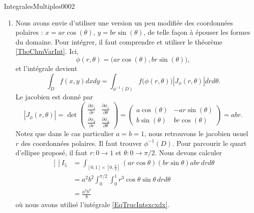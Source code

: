 \begin{corrige}{IntegralesMultiples0002}
\begin{enumerate}
		\item
			Nous avons envie d'utiliser une version un peu modifiée des coordonnées polaires : $x=ar\cos(\theta)$, $y=br\sin(\theta)$, de telle façon à épouser les formes du domaine. Pour intégrer, il faut comprendre et utiliser le théorème \ref{ThoChmVarInt}. Ici,
			\begin{equation}
				\phi(r,\theta)=\big( ar\cos(\theta),br\sin(\theta) \big),
			\end{equation}
			et l'intégrale devient
			\begin{equation}
				\int_D f(x,y)dxdy=\int_{\phi^{-1}(D)}f\big( \phi(r,\theta) \big)| J_{\phi}(r,\theta) |drd\theta.
			\end{equation}
			Le jacobien est donné par
			\begin{equation}
				| J_{\phi}(r,\theta) |=\det\begin{pmatrix}
					\frac{ \partial \phi_1 }{ \partial r }	&	\frac{ \partial \phi_1 }{ \partial \theta }	\\ 
					\frac{ \partial \phi_2 }{ \partial r }	&	\frac{ \partial \phi_2 }{ \partial \theta }	
				\end{pmatrix}=
				\begin{pmatrix}
					a\cos(\theta)	&	-ar\sin(\theta)	\\ 
					b\sin(\theta)	&	br\cos(\theta)	
				\end{pmatrix}=
				abr.
			\end{equation}
			Notez que dans le cas particulier $a=b=1$, nous retrouvons le jacobien usuel $r$ des coordonnées polaires. Il faut trouver $\phi^{-1}(D)$. Pour parcourir le quart d'ellipse proposé, il faut $r\colon 0\to 1$ et $\theta\colon 0\to \pi/2$. Nous devons calculer
			\begin{equation}
				\begin{aligned}[]
					I_5&=\int_{[0,1]\times [0,\frac{ \pi }{2}]}(ar\cos\theta)(br\sin\theta) abr\,drd\theta\\
					&=a^2b^2\int_{0}^{\pi/2}\int_0^1r^3\cos\theta\sin\theta\,drd\theta\\
					&=\frac{ a^2b^2 }{ 8 }
				\end{aligned}
			\end{equation}
			où nous avons utilisé l'intégrale \eqref{EqTrucIntsxcxdx}.
			
	\end{enumerate}

\end{corrige}
